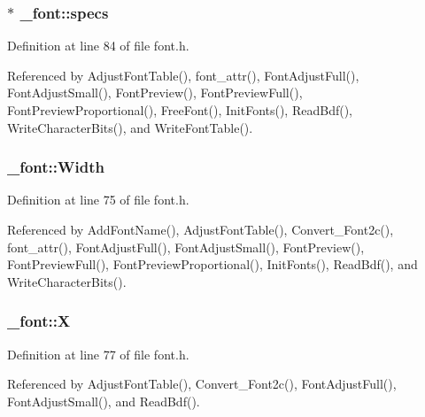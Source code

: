 \hypertarget{struct__font_a76b5b07cf75a869627eca27d7a32836a}{
\subsubsection[{specs}]{ $\ast$ \-\_\-font\-::specs}}\label{struct__font_a76b5b07cf75a869627eca27d7a32836a}


Definition at line 84 of file font.\-h.



Referenced by Adjust\-Font\-Table(), font\-\_\-attr(), Font\-Adjust\-Full(), Font\-Adjust\-Small(), Font\-Preview(), Font\-Preview\-Full(), Font\-Preview\-Proportional(), Free\-Font(), Init\-Fonts(), Read\-Bdf(), Write\-Character\-Bits(), and Write\-Font\-Table().

\hypertarget{struct__font_ae3d3b48670f1bf4bf6dbf42794f81b31}{
\subsubsection[{Width}]{ \-\_\-font\-::\-Width}}\label{struct__font_ae3d3b48670f1bf4bf6dbf42794f81b31}


Definition at line 75 of file font.\-h.



Referenced by Add\-Font\-Name(), Adjust\-Font\-Table(), Convert\-\_\-\-Font2c(), font\-\_\-attr(), Font\-Adjust\-Full(), Font\-Adjust\-Small(), Font\-Preview(), Font\-Preview\-Full(), Font\-Preview\-Proportional(), Init\-Fonts(), Read\-Bdf(), and Write\-Character\-Bits().

\hypertarget{struct__font_a64a08fdbdaa19418a9b7a34a2db33150}{
\subsubsection[{X}]{ \-\_\-font\-::\-X}}\label{struct__font_a64a08fdbdaa19418a9b7a34a2db33150}


Definition at line 77 of file font.\-h.



Referenced by Adjust\-Font\-Table(), Convert\-\_\-\-Font2c(), Font\-Adjust\-Full(), Font\-Adjust\-Small(), and Read\-Bdf().

